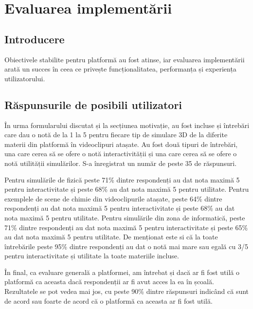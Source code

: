 \chapter{Evaluarea implementării}
\label{chapter:evaluare}

\section{Introducere}
Obiectivele stabilite pentru platformă au fost atinse, iar evaluarea implementării arată un succes în ceea ce privește funcționalitatea, 
performanța și experiența utilizatorului.


\section{Răspunsurile de posibili utilizatori}
\label{subsec:evaluare-backend-utilizatori}

În urma formularului discutat și la secțiunea motivație, au fost incluse și întrebări care dau o notă de la 1 la 5 pentru
fiecare tip de simulare 3D de la diferite materii din platformă în videoclipuri atașate. Au fost două tipuri de întrebări, 
una care cerea să se ofere o notă interactivității și una care cerea să se ofere o notă utilității simulărilor. S-a
înregistrat un număr de peste 35 de răspunsuri.

Pentru simulările de fizică peste 71\% dintre respondenți au dat nota maximă 5 pentru interactivitate și peste
68\% au dat nota maximă 5 pentru utilitate. Pentru exemplele de scene de chimie din videoclipurile atașate,
peste 64\% dintre respondenți au dat nota maximă 5 pentru interactivitate și peste 68\% au dat nota maximă 5 pentru utilitate.
Pentru simulările din zona de informatică, peste 71\% dintre respondenți au dat nota maximă 5 
pentru interactivitate și peste 65\% au dat nota maximă 5 pentru utilitate. De menționat este si că la toate
întrebările peste 95\% dintre respondenți au dat o notă mai mare sau egală cu 3/5 pentru interactivitate și utilitate la toate
materiile incluse.

În final, ca evaluare generală a platformei, am întrebat și dacă ar fi fost utilă o platformă ca aceasta dacă
respondenții ar fi avut acces la ea în școală. Rezultatele se pot vedea mai jos, cu peste 90\% dintre răspunsuri
indicând că sunt de acord sau foarte de acord că o platformă ca aceasta ar fi fost utilă.


